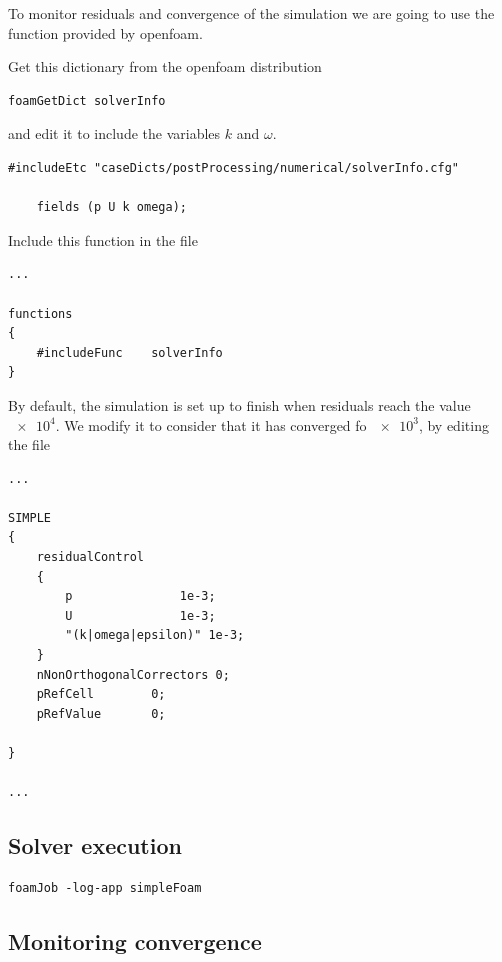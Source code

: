 \documentclass[
    parskip=half,      %
    DIV=12,            %
    headings=normal,   %
    fontsize=11pt,     %
    english            %
]{scrartcl}
\begin{document}
To monitor residuals and convergence of the simulation we are going to use the 
 function provided by openfoam. 

Get this dictionary from the openfoam distribution
\begin{lstlisting}[style=terminal]
	foamGetDict solverInfo
\end{lstlisting}
and edit it to include the variables $k$ and $\omega$.

\begin{lstlisting}[style=openfoam, caption={\filename{system/solverInfo} file.}]
	#includeEtc "caseDicts/postProcessing/numerical/solverInfo.cfg"
	
	fields (p U k omega);
\end{lstlisting}

Include this function in the  file

\begin{lstlisting}[style=openfoam, caption={\texttt{fuctions} subdictionary of 
		\filename{system/controlDict} file.}]
...

functions
{
	#includeFunc    solverInfo
}
\end{lstlisting}

By default, the simulation is set up to finish when residuals reach the value $\num{e4}$.
We modify it to consider that it has converged fo $\num{e3}$, by editing the file

\begin{lstlisting}[style=openfoam, caption={\texttt{SIMPLE} subdictionary of 
		\filename{system/fvSolution} file to control simulation convergence criteria.}]
...
	
SIMPLE
{
	residualControl
	{
		p               1e-3;
		U               1e-3;
		"(k|omega|epsilon)" 1e-3;
	}
	nNonOrthogonalCorrectors 0;
	pRefCell        0;
	pRefValue       0;
	
}

...
\end{lstlisting}

\subsection{Solver execution}

\begin{lstlisting}[style=terminal]
foamJob -log-app simpleFoam
\end{lstlisting}

\subsection{Monitoring convergence}
\end{document}
